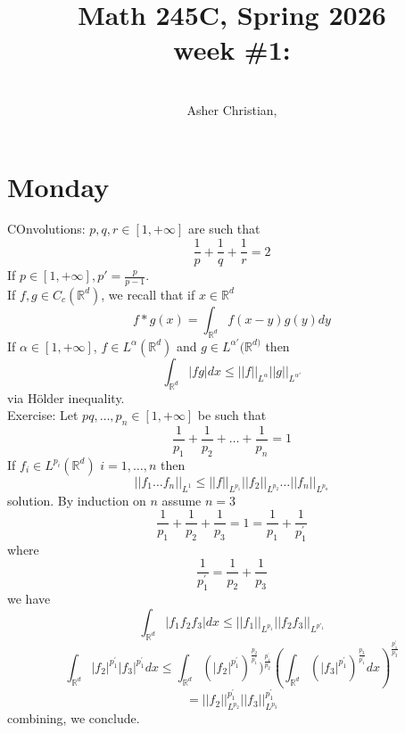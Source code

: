 \documentclass[11pt]{article}
\newcommand{\cnum}{Math 245C}
\newcommand{\ced}{Spring 2026}
\newcommand{\ctitle}[4]{\title{\vspace{-0.5in}\cnum, \ced\\week #1: #2}\author{\vspace{-0.35in}\\#3, #4}}
\begin{document}
\ctitle{\#1}{}{Asher Christian}{}
\date{}
\maketitle

\section{Monday}
COnvolutions:
$p,q,r \in [1,+\infty]$ are such that
\[
\frac{1}{p} + \frac{1}{q} + \frac{1}{r} = 2
\] 
If $ p \in [1,+\infty], p' = \frac{p}{p-1}$.\\
If $f, g \in C_c( \mathbb{R}^{d})$, we 
recall that if $x \in \mathbb{R}^{d}$ 
\[
f * g(x) = \int_{ \mathbb{R}^{d}}^{}f(x-y)g(y)dy
\] 
If $\alpha \in [1,+\infty]$, $f \in L^{\alpha}( \mathbb{R}^{d})$ and $g \in L^{\alpha'}( \mathbb{R}^{d)}$ then
\[
    \int_{ \mathbb{R}^{d}}^{}|fg|dx \le ||f||_{L^{\alpha}}||g||_{L^{\alpha'}}
\] 
via Hölder inequality.\\
Exercise: Let $pq,\dots,p_n \in [1,+\infty]$ be such that
\[
\frac{1}{p_1} + \frac{1}{p_2} + \dots + \frac{1}{p_n} = 1
\] 
If $f_i \in L^{p_i}( \mathbb{R}^{d})$ $i = 1,\dots,n$ then
 \[
     ||f_1 \dots f_n||_{L^{1}} \le ||f||_{L^{p_1}}||f_2||_{L^{p_2}}\dots||f_n||_{L^{p_n}}
\] 
solution.
By induction on $n$
assume  $n = 3$
 \[
\frac{1}{p_1} + \frac{1}{p_2} + \frac{1}{p_3} = 1 = \frac{1}{p_1} + \frac{1}{p^{'}_1}
\] 
where
\[
\frac{1}{p^{'}_1} = \frac{1}{p_2} + \frac{1}{p_3}
\] 
we have
\[
    \int_{ \mathbb{R}^{d}}^{}|f_1f_2f_3|dx \le ||f_1||_{L^{p_1}} ||f_2f_3||_{L^{p'_1}}
\] 
\[
\int_{ \mathbb{R}^{d}}^{}|f_2|^{p_1^{'}}|f_3|^{p_1^{'}}dx \le \int_{ \mathbb{R}^{d}}^{}(|f_2|^{p_1^{'}})^{\frac{p_2}{p_1^{'}}})^{\frac{p_1^{'}}{p_2}} \left( \int_{ \mathbb{R}^{d}}^{}(|f_3|^{p_1^{'}})^{\frac{p_3}{p_1^{'}}}dx\right)^{\frac{p_1^{'}}{p_3}}
\] 
\[
    = ||f_2||_{L^{p_2}}^{p_1^{'}}||f_3||_{L^{p_3}}^{p_1^{'}}
\] 
combining, we conclude.
\end{document}
